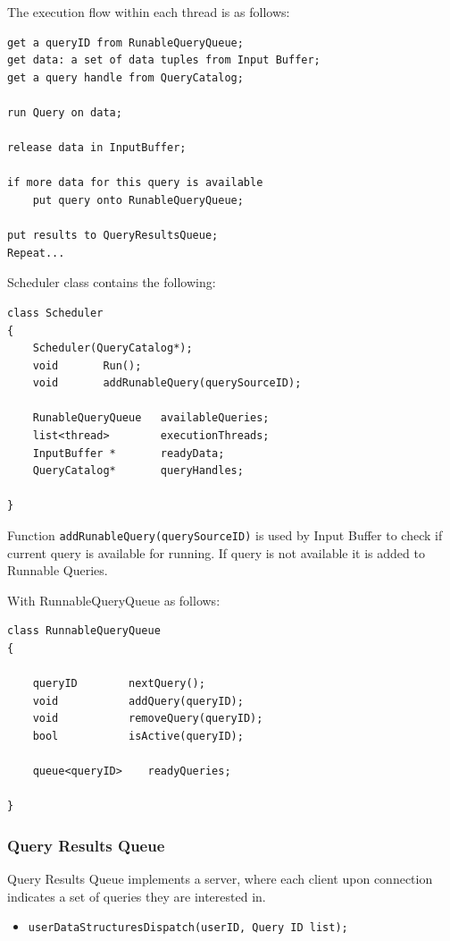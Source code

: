 \documentclass[14pt]{article}
\begin{document}
The execution flow within each thread is as follows:

\begin{verbatim}
get a queryID from RunableQueryQueue;
get data: a set of data tuples from Input Buffer;
get a query handle from QueryCatalog;

run Query on data;

release data in InputBuffer;

if more data for this query is available
	put query onto RunableQueryQueue;

put results to QueryResultsQueue;
Repeat...

\end{verbatim}

Scheduler class contains the following:

\begin{verbatim}
class Scheduler
{
	Scheduler(QueryCatalog*);
    void       Run();
    void       addRunableQuery(querySourceID);

    RunableQueryQueue   availableQueries;
    list<thread>        executionThreads;
    InputBuffer *       readyData;
	QueryCatalog*       queryHandles;
	
}
\end{verbatim}

Function {\tt addRunableQuery(querySourceID)} is used by Input Buffer to check if current query is available for running. If query is not available it is added to Runnable Queries.

\noindent With RunnableQueryQueue as follows:

\begin{verbatim}
class RunnableQueryQueue
{
    
    queryID        nextQuery();
    void           addQuery(queryID);
    void           removeQuery(queryID);
    bool           isActive(queryID);

    queue<queryID>    readyQueries;
	
}
\end{verbatim}


\subsubsection{Query Results Queue}

Query Results Queue implements a server, where each client upon connection indicates a set of queries they are interested in.

\begin{itemize}
	\item {\tt userDataStructuresDispatch(userID, Query ID list);}
\end{itemize}
\end{document}
